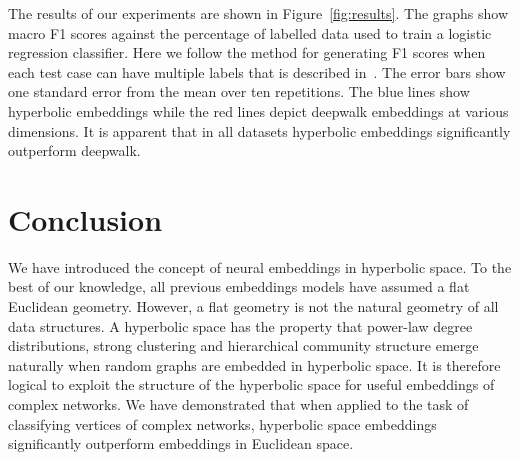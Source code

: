 \documentclass[sigconf, review]{acmart}
\begin{document}
The results of our experiments are shown in Figure~\ref{fig:results}. The graphs show macro F1 scores against the percentage of labelled data used to train a logistic regression classifier. Here we follow the method for generating F1 scores when each test case can have multiple labels that is described in~\cite{Liu2006}. The error bars show one standard error from the mean over ten repetitions. The blue lines show hyperbolic embeddings while the red lines depict deepwalk embeddings at various dimensions. It is apparent that in all datasets hyperbolic embeddings significantly outperform deepwalk. 



\section{Conclusion}

We have introduced the concept of neural embeddings in hyperbolic space. To the best of our knowledge, all previous embeddings models have assumed a flat Euclidean geometry. However, a flat geometry is not the natural geometry of all data structures.
A hyperbolic space has the property that power-law degree distributions, strong clustering and hierarchical community structure  emerge naturally when random graphs are embedded in hyperbolic space. It is therefore logical to exploit the structure of the hyperbolic space for useful embeddings of complex networks.  We have demonstrated that when applied to the task of classifying vertices of complex networks, hyperbolic space embeddings significantly outperform embeddings in Euclidean space. 







\end{document}
